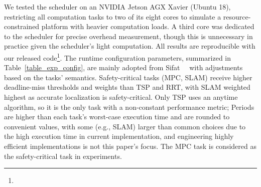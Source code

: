     We tested the scheduler on an NVIDIA Jetson AGX Xavier (Ubuntu 18), restricting all computation tasks to two of its eight cores to simulate a resource-constrained platform with heavier computation loads.
    A third core was dedicated to the scheduler for precise overhead measurement, though this is unnecessary in practice given the scheduler's light computation.
    All results are reproducible with our released code\footnote{\githubLink{}}.
    The runtime configuration parameters, summarized in Table~\ref{table_exp_config}, are mainly adopted from Sifat~\etal~\cite{Ash23RAL} with adjustments based on the tasks' semantics.
    Safety-critical tasks (MPC, SLAM) receive higher deadline-miss thresholds and weights than TSP and RRT, with SLAM weighted highest as accurate localization is safety-critical.
    Only TSP uses an anytime algorithm, so it is the only task with a non-constant performance metric;
    Periods are higher than each task's worst-case execution time and are rounded to convenient values, with some (e.g., SLAM) larger than common choices due to the high execution time in current implementation, 
	and engineering highly efficient implementations is not this paper's focus.
    The MPC task is considered as the safety-critical task in experiments.
    

